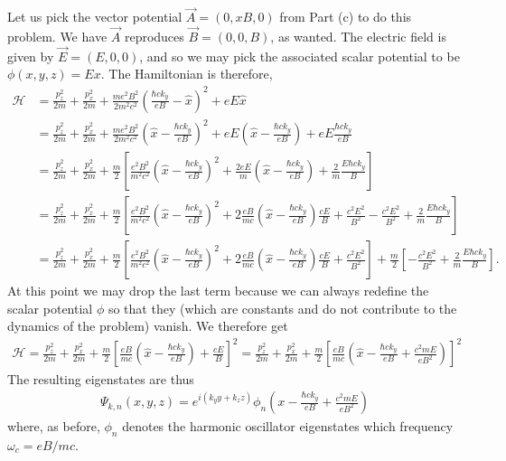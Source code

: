 \documentclass{article}
\theoremstyle{definition}
\newcommand{\ham}{\mathcal{H}}
\newcommand{\f}[2]{\frac{#1}{#2}}
\newcommand{\lp}{\left(}
\newcommand{\rp}{\right)}
\newcommand{\lb}{\left[}
\newcommand{\rb}{\right]}
\begin{document}
Let us pick the vector potential $\vec{A} = (0,xB,0)$ from Part (c) to do this problem. We have $\vec{A}$ reproduces $\vec{B} = (0,0,B)$, as wanted. The electric field is given by $\vec{E} = (E,0,0)$, and so we may pick the associated scalar potential to be $\phi(x,y,z) =Ex$.  The Hamiltonian is therefore, 
\begin{align*}
\ham 
&=  \f{p_z^2}{2m} + \f{p_x^2}{2m} + \f{m e^2 B^2}{2m^2c^2}\lp \f{\hbar c k_y}{eB} - \hat{x} \rp^2 + eE\hat{x}\\
&= \f{p_z^2}{2m} + \f{p_x^2}{2m} + \f{m e^2 B^2}{2m^2c^2}\lp \hat{x} - \f{\hbar c k_y}{eB}  \rp^2 + eE\lp \hat{x}- \f{\hbar c k_y}{eB} \rp + eE\f{\hbar c k_y}{eB} \\
&= \f{p_z^2}{2m} + \f{p_x^2}{2m} + 
\f{m}{2}
\lb  \f{e^2 B^2}{m^2c^2}\lp \hat{x} - \f{\hbar c k_y}{eB}  \rp^2 + \f{2eE}{m}\lp \hat{x}- \f{\hbar c k_y}{eB} \rp + \f{2}{m}\f{E\hbar c k_y}{B} \rb \\
&= \f{p_z^2}{2m} + \f{p_x^2}{2m} + 
\f{m}{2}
\lb  \f{e^2 B^2}{m^2c^2}\lp \hat{x} - \f{\hbar c k_y}{eB}  \rp^2 + 2\f{{eB}}{mc}\lp \hat{x}- \f{\hbar c k_y}{eB} \rp \f{cE}{B} + \f{c^2E^2}{B^2} - \f{c^2E^2}{B^2} + \f{2}{m}\f{E\hbar c k_y}{B} \rb \\
&= \f{p_z^2}{2m} + \f{p_x^2}{2m} + 
\f{m}{2}
\lb  \f{e^2 B^2}{m^2c^2}\lp \hat{x} - \f{\hbar c k_y}{eB}  \rp^2 + 2\f{{eB}}{mc}\lp \hat{x}- \f{\hbar c k_y}{eB} \rp \f{cE}{B} + \f{c^2E^2}{B^2}\rb + \f{m}{2}\lb - \f{c^2E^2}{B^2} + \f{2}{m}\f{E\hbar c k_y}{B} \rb.
\end{align*}
At this point we may drop the last term because we can always redefine the scalar potential $\phi$ so that they (which are constants and do not contribute to the dynamics of the problem) vanish. We therefore get
\begin{align*}
\ham = \f{p_z^2}{2m} + \f{p_x^2}{2m} + 
\f{m}{2}
\lb  \f{{eB}}{mc}\lp \hat{x}- \f{\hbar c k_y}{eB} \rp  + \f{cE}{B}  \rb^2 = \f{p_z^2}{2m} + \f{p_x^2}{2m} + 
\f{m}{2}
\lb  \f{{eB}}{mc}\lp \hat{x}- \f{\hbar c k_y}{eB} + \f{c^2 mE}{eB^2} \rp   \rb^2
\end{align*}
The resulting eigenstates are thus
\begin{align*}
\Psi_{k,n}(x,y,z) = e^{i(k_y y + k_z z )} \phi_n\lp x - \f{\hbar c k_y}{eB}+ \f{c^2 mE}{eB^2}\rp
\end{align*}
where, as before, $\phi_n$ denotes the harmonic oscillator eigenstates which frequency $\omega_c = eB/mc$.\\
\end{document}
